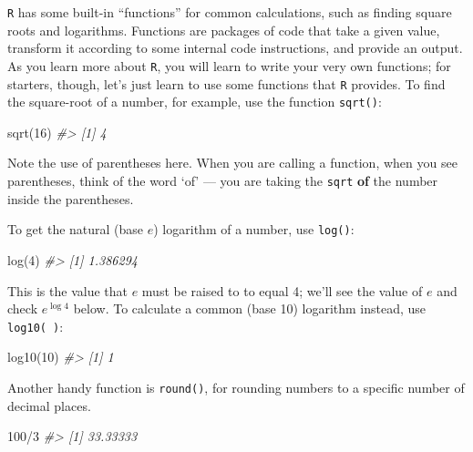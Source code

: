 \documentclass[
]{book}
\newenvironment{Shaded}{\begin{snugshade}}{\end{snugshade}}
\newcommand{\CommentTok}[1]{\textcolor[rgb]{0.56,0.35,0.01}{\textit{#1}}}
\newcommand{\DecValTok}[1]{\textcolor[rgb]{0.00,0.00,0.81}{#1}}
\newcommand{\FunctionTok}[1]{\textcolor[rgb]{0.00,0.00,0.00}{#1}}
\newcommand{\NormalTok}[1]{#1}
\newcommand{\SpecialCharTok}[1]{\textcolor[rgb]{0.00,0.00,0.00}{#1}}
\begin{document}
\texttt{R} has some built-in ``functions'' for common calculations, such as finding square roots and logarithms. Functions are packages of code that take a given value, transform it according to some internal code instructions, and provide an output. As you learn more about \texttt{R}, you will learn to write your very own functions; for starters, though, let's just learn to use some functions that \texttt{R} provides. To find the square-root of a number, for example, use the function \texttt{sqrt()}:

\begin{Shaded}
\begin{Highlighting}[]
\FunctionTok{sqrt}\NormalTok{(}\DecValTok{16}\NormalTok{)}
\CommentTok{\#\textgreater{} [1] 4}
\end{Highlighting}
\end{Shaded}

Note the use of parentheses here. When you are calling a function, when you see parentheses, think of the word `of' --- you are taking the \texttt{sqrt} \textbf{of} the number inside the parentheses.

To get the natural (base \(e\)) logarithm of a number, use \texttt{log()}:

\begin{Shaded}
\begin{Highlighting}[]
\FunctionTok{log}\NormalTok{(}\DecValTok{4}\NormalTok{)}
\CommentTok{\#\textgreater{} [1] 1.386294}
\end{Highlighting}
\end{Shaded}

This is the value that \(e\) must be raised to to equal 4; we'll see the value of \(e\) and check \(e^{\log{4}}\) below. To calculate a common (base 10) logarithm instead, use \texttt{log10(\ )}:

\begin{Shaded}
\begin{Highlighting}[]
\FunctionTok{log10}\NormalTok{(}\DecValTok{10}\NormalTok{)}
\CommentTok{\#\textgreater{} [1] 1}
\end{Highlighting}
\end{Shaded}

Another handy function is \texttt{round()}, for rounding numbers to a specific number of decimal places.

\begin{Shaded}
\begin{Highlighting}[]
\DecValTok{100}\SpecialCharTok{/}\DecValTok{3}
\CommentTok{\#\textgreater{} [1] 33.33333}
\end{Highlighting}
\end{Shaded}
\end{document}
